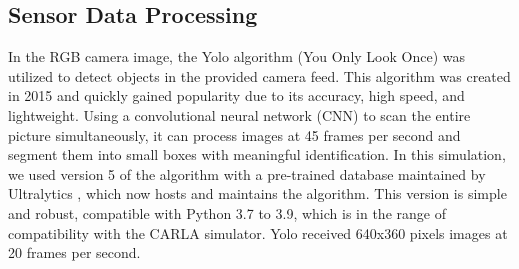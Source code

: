 \documentclass[conference]{IEEEtran}
\begin{document}
\subsection{Sensor Data Processing}



In the RGB camera image, the Yolo algorithm (You Only Look Once) was utilized to detect objects in the provided camera feed. This algorithm was created in 2015 and quickly gained popularity due to its accuracy, high speed, and lightweight. Using a convolutional neural network (CNN) to scan the entire picture simultaneously, it can process images at 45 frames per second and segment them into small boxes with meaningful identification. In this simulation, we used version 5 of the algorithm with a pre-trained database maintained by Ultralytics \cite{ultralytics2024}, which now hosts and maintains the algorithm. This version is simple and robust, compatible with Python 3.7 to 3.9, which is in the range of compatibility with the CARLA simulator. Yolo received 640x360 pixels images at 20 frames per second.




\end{document}
